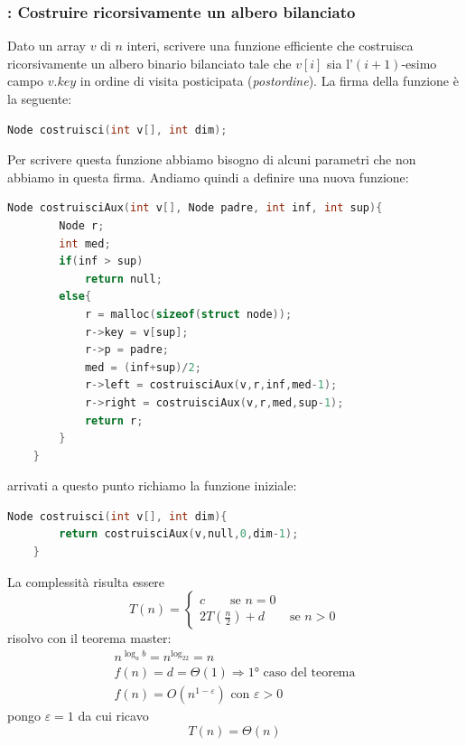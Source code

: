 \documentclass[italian]{article}
\newcommand{\fn}{f(n)}
\newcommand{\exercize}{\text{\faPencil $\;$ Esercizio }}
\begin{document}
\subsubsection{\exercize: Costruire ricorsivamente un albero bilanciato}
Dato un array $v$ di $n$ interi, scrivere una funzione efficiente che costruisca ricorsivamente un albero binario bilanciato tale che $v[i]$ sia l'$(i+1)$-esimo campo $v.key$ in ordine di visita posticipata (\textit{postordine}). La firma della funzione è la seguente:
\begin{lstlisting}[language=c,mathescape=true]
	Node costruisci(int v[], int dim);
\end{lstlisting}
Per scrivere questa funzione abbiamo bisogno di alcuni parametri che non abbiamo in questa firma. Andiamo quindi a definire una nuova funzione:
\begin{lstlisting}[language=c,mathescape=true]
	Node costruisciAux(int v[], Node padre, int inf, int sup){
		Node r;
		int med;
		if(inf > sup)
			return null;
		else{
			r = malloc(sizeof(struct node));
			r->key = v[sup];
			r->p = padre;
			med = (inf+sup)/2;
			r->left = costruisciAux(v,r,inf,med-1);
			r->right = costruisciAux(v,r,med,sup-1);
			return r;
		}
	}
\end{lstlisting}
arrivati a questo punto richiamo la funzione iniziale:
\begin{lstlisting}[language=c,mathescape=true]
	Node costruisci(int v[], int dim){
		return costruisciAux(v,null,0,dim-1);
	}
\end{lstlisting}
La complessità risulta essere 
\[
	T(n) = 
	\begin{cases*}
		c \qquad\text{se } n=0 \\
		2T(\frac{n}{2}) + d \qquad\text{se } n>0 
	\end{cases*}
\]
risolvo con il teorema master:
\begin{gather*}
	n^{\log_ab} = n^{\log_22} = n \\
	\fn = d = \varTheta(1) \Rightarrow \text{1° caso del teorema} \\
	\fn = O(n^{1-\varepsilon}) \text{ con } \varepsilon > 0
\end{gather*}
pongo $\varepsilon = 1$ da cui ricavo 
\[
	T(n) = \varTheta(n)
\]
\end{document}
